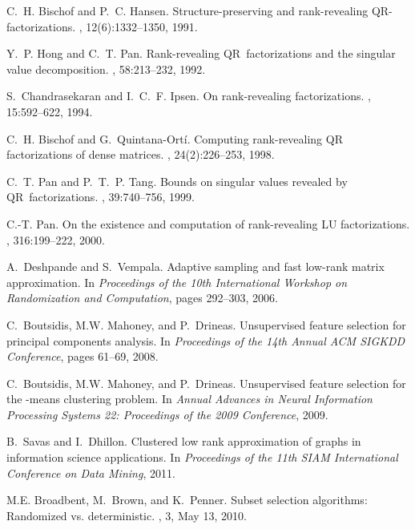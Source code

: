 \documentclass[twoside]{article}
\begin{document}
\begin{small}
\begin{thebibliography}{100}
C.~H. Bischof and P.~C. Hansen.
\newblock Structure-preserving and rank-revealing {QR}-factorizations.
,
  12(6):1332--1350, 1991.

Y.~P. Hong and C.~T. Pan.
\newblock Rank-revealing {QR}~factorizations and the singular value
  decomposition.
, 58:213--232, 1992.

S.~Chandrasekaran and I.~C.~F. Ipsen.
\newblock On rank-revealing factorizations.
, 15:592--622,
  1994.

C.~H. Bischof and G.~Quintana-Ort{\'i}.
\newblock Computing rank-revealing {QR} factorizations of dense matrices.
, 24(2):226--253,
  1998.

C.~T. Pan and P.~T.~P. Tang.
\newblock Bounds on singular values revealed by {QR}~factorizations.
, 39:740--756, 1999.

C.-T. Pan.
\newblock On the existence and computation of rank-revealing {LU}
  factorizations.
, 316:199--222, 2000.

A.~Deshpande and S.~Vempala.
\newblock Adaptive sampling and fast low-rank matrix approximation.
\newblock In {\em Proceedings of the 10th International Workshop on
  Randomization and Computation}, pages 292--303, 2006.

C.~Boutsidis, M.W. Mahoney, and P.~Drineas.
\newblock Unsupervised feature selection for principal components analysis.
\newblock In {\em Proceedings of the 14th Annual ACM SIGKDD Conference}, pages
  61--69, 2008.

C.~Boutsidis, M.W. Mahoney, and P.~Drineas.
\newblock Unsupervised feature selection for the -means clustering problem.
\newblock In {\em Annual Advances in Neural Information Processing Systems 22:
  Proceedings of the 2009 Conference}, 2009.

B.~Savas and I.~Dhillon.
\newblock Clustered low rank approximation of graphs in information science
  applications.
\newblock In {\em Proceedings of the 11th SIAM International Conference on Data
  Mining}, 2011.

M.E. Broadbent, M.~Brown, and K.~Penner.
\newblock Subset selection algorithms: Randomized vs. deterministic.
, 3, May 13, 2010.


\end{thebibliography}
\end{small}
\end{document}

